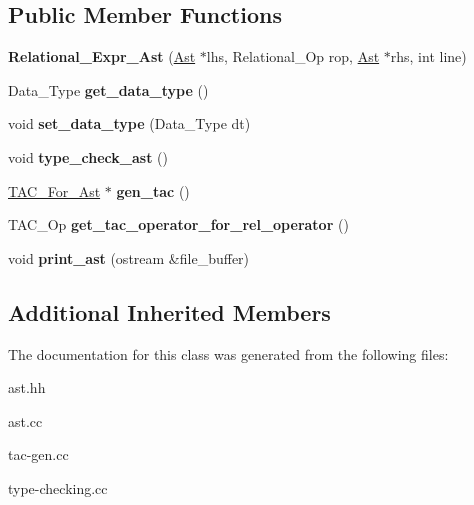\subsection*{Public Member Functions}
\begin{DoxyCompactItemize}
\item 
\mbox{\label{classRelational__Expr__Ast_ad28ee128820b558845b7d14545bcd53f}} 
{\bfseries Relational\+\_\+\+Expr\+\_\+\+Ast} (\hyperlink{classAst}{Ast} $\ast$lhs, Relational\+\_\+\+Op rop, \hyperlink{classAst}{Ast} $\ast$rhs, int line)
\item 
\mbox{\label{classRelational__Expr__Ast_ad266e8a73c627dad1e377978642b89f9}} 
Data\+\_\+\+Type {\bfseries get\+\_\+data\+\_\+type} ()
\item 
\mbox{\label{classRelational__Expr__Ast_a39a7103a6502104eb3f1b783745ac906}} 
void {\bfseries set\+\_\+data\+\_\+type} (Data\+\_\+\+Type dt)
\item 
\mbox{\label{classRelational__Expr__Ast_ae51bc5c519c0dae61628ddaa1396e28f}} 
void {\bfseries type\+\_\+check\+\_\+ast} ()
\item 
\mbox{\label{classRelational__Expr__Ast_a012496a06535337b3fc3c4c6a5c6ee41}} 
\hyperlink{classTAC__For__Ast}{T\+A\+C\+\_\+\+For\+\_\+\+Ast} $\ast$ {\bfseries gen\+\_\+tac} ()
\item 
\mbox{\label{classRelational__Expr__Ast_a37d47c26478e269b2feb97bf59251ffb}} 
T\+A\+C\+\_\+\+Op {\bfseries get\+\_\+tac\+\_\+operator\+\_\+for\+\_\+rel\+\_\+operator} ()
\item 
\mbox{\label{classRelational__Expr__Ast_aa618711f9c7cd08352da53129d65d9c4}} 
void {\bfseries print\+\_\+ast} (ostream \&file\+\_\+buffer)
\end{DoxyCompactItemize}
\subsection*{Additional Inherited Members}


The documentation for this class was generated from the following files\+:\begin{DoxyCompactItemize}
\item 
ast.\+hh\item 
ast.\+cc\item 
tac-\/gen.\+cc\item 
type-\/checking.\+cc\end{DoxyCompactItemize}
